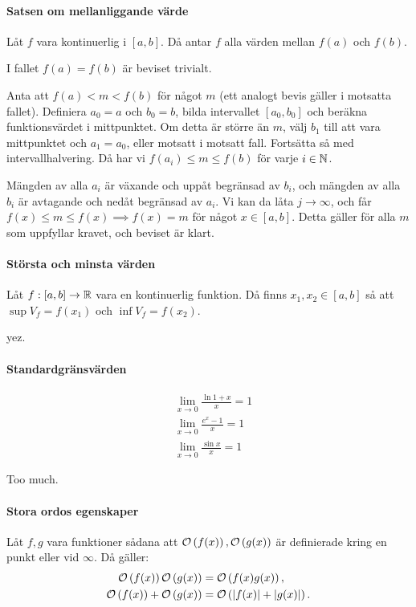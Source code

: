 \proof

\paragraph{Satsen om mellanliggande värde}
Låt $f$ vara kontinuerlig i $[a, b]$. Då antar $f$ alla värden mellan $f(a)$ och $f(b)$.

\proof
I fallet $f(a) = f(b)$ är beviset trivialt.

Anta att $f(a) < m < f(b)$ för något $m$ (ett analogt bevis gäller i motsatta fallet). Definiera $a_0 = a$ och $b_0 = b$, bilda intervallet $[a_0, b_0]$ och beräkna funktionsvärdet i mittpunktet. Om detta är större än $m$, välj $b_1$ till att vara mittpunktet och $a_1 = a_0$, eller motsatt i motsatt fall. Fortsätta så med intervallhalvering. Då har vi $f(a_i)\leq m\leq f(b)$ för varje $i\in\mathbb{N}$.

Mängden av alla $a_i$ är växande och uppåt begränsad av $b_i$, och mängden av alla $b_i$ är avtagande och nedåt begränsad av $a_i$. Vi kan da låta $j\to\infty$, och får $f(x)\leq m\leq f(x)\implies f(x) = m$ för något $x\in [a, b]$. Detta gäller för alla $m$ som uppfyllar kravet, och beviset är klart.

\paragraph{Största och minsta värden}
Låt $f: [a,b]\to\mathbb{R}$ vara en kontinuerlig funktion. Då finns $x_1, x_2\in [a,b]$ så att $\sup{V_f} = f(x_1)$ och $\inf{V_f} = f(x_2)$.

\proof
yez.

\paragraph{Standardgränsvärden}
\begin{align*}
	&\lim\limits_{x\to 0}\frac{\ln{1 + x}}{x} = 1 \\
	&\lim\limits_{x\to 0}\frac{e^x - 1}{x} = 1 \\
	&\lim\limits_{x\to 0}\frac{\sin{x}}{x} = 1
\end{align*}

\proof
Too much.

\paragraph{Stora ordos egenskaper}
Låt $f, g$ vara funktioner sådana att $\mathcal{O}\left(f(x)\right), \mathcal{O}\left(g(x)\right)$ är definierade kring en punkt eller vid $\infty$. Då gäller:
\begin{align*}
	\mathcal{O}\left(f(x)\right)\mathcal{O}\left(g(x)\right)    &= \mathcal{O}\left(f(x)g(x)\right), \\
	\mathcal{O}\left(f(x)\right) + \mathcal{O}\left(g(x)\right) &= \mathcal{O}\left(\abs{f(x)} + \abs{g(x)}\right).
\end{align*}

\proof